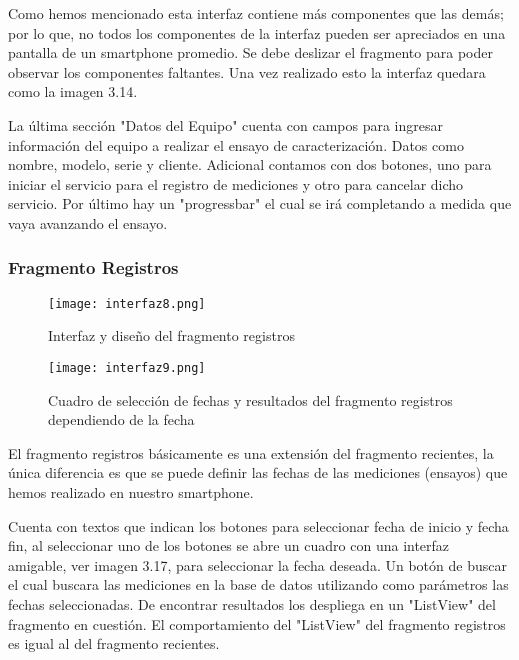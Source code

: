 \par \noindent
Como hemos mencionado esta interfaz contiene más componentes que las demás; por lo que, no todos los componentes de la interfaz pueden ser apreciados en una pantalla de un smartphone promedio. Se debe deslizar el fragmento para poder observar los componentes faltantes. Una vez realizado esto la interfaz quedara como la imagen 3.14. 

\par \noindent
La última sección "Datos del Equipo" cuenta con campos para ingresar información del equipo a realizar el ensayo de caracterización. Datos como nombre, modelo, serie y cliente. Adicional contamos con dos botones, uno para iniciar el servicio para el registro de mediciones y otro para cancelar dicho servicio. Por último hay un "progressbar" el cual se irá completando a medida que vaya avanzando el ensayo.

\subsubsection{Fragmento Registros}

\begin{figure}[H]
	\centering
	\texttt{[image: interfaz8.png]}
	\caption{Interfaz y diseño del fragmento registros}
\end{figure}

\begin{figure}[H]
	\centering
	\texttt{[image: interfaz9.png]}
	\caption{Cuadro de selección de fechas y resultados del fragmento registros dependiendo de la fecha}
\end{figure}

\par
El fragmento registros básicamente es una extensión del fragmento recientes, la única diferencia es que se puede definir las fechas de las mediciones (ensayos) que hemos realizado en nuestro smartphone. 

\par \noindent
Cuenta con textos que indican los botones para seleccionar fecha de inicio y fecha fin, al seleccionar uno de los botones se abre un cuadro con una interfaz amigable, ver imagen 3.17, para seleccionar la fecha deseada. Un botón de buscar el cual buscara las mediciones en la base de datos utilizando como parámetros las fechas seleccionadas. De encontrar resultados los despliega en un "ListView" del fragmento en cuestión. El comportamiento del "ListView" del fragmento registros es igual al del fragmento recientes.

